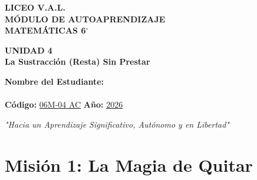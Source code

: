 \documentclass[12pt, letterpaper]{article}
\begin{document}
	
	\begin{center}
		\vspace*{1cm}
		{\Huge \textbf{LICEO V.A.L.}}\\[0.5cm]
		{\LARGE \textbf{MÓDULO DE AUTOAPRENDIZAJE}}\\[0.5cm]
		{\Large \textbf{MATEMÁTICAS 6$^\circ$}}\\[0.5cm]
		
		\begin{tcolorbox}[colback=valblue!10, colframe=valblue, arc=3mm, boxrule=1.5pt]
			\centering \Huge \textbf{UNIDAD 4}\\[0.2cm]
			\Large \textbf{La Sustracción (Resta) Sin Prestar}
		\end{tcolorbox}
		
		\vspace{0.6cm}
		\begin{tcolorbox}[colback=white, colframe=valblue, width=12cm, arc=3mm, boxrule=1.5pt]
			\centering
			\vspace{0.3cm}
			\textbf{Nombre del Estudiante:}\\[0.3cm]
			\underline{\hspace{9cm}}\\[0.5cm]
			\textbf{Código:} \underline{06M-04 AC} \hspace{1cm} \textbf{Año:} \underline{2026}
			\vspace{0.3cm}
		\end{tcolorbox}
		
		\vspace{0.8cm}
		\textit{"Hacia un Aprendizaje Significativo, Autónomo y en Libertad"}
		
	
	\end{center}
	
	
	
	\section*{Misión 1: La Magia de Quitar}
	
\end{document}
